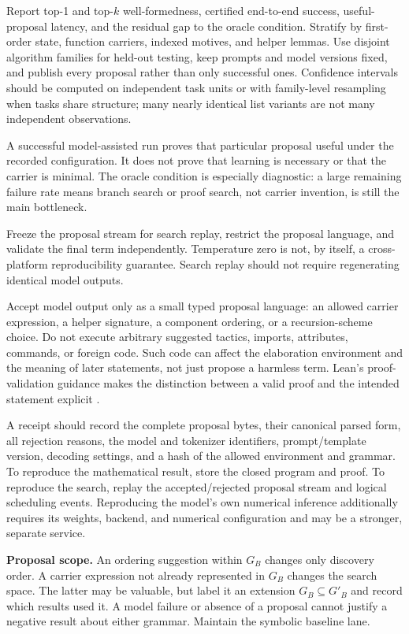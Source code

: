 Report top-1 and top-$k$ well-formedness, certified end-to-end success, useful-proposal latency, and the residual gap to the oracle condition. Stratify by first-order state, function carriers, indexed motives, and helper lemmas. Use disjoint algorithm families for held-out testing, keep prompts and model versions fixed, and publish every proposal rather than only successful ones. Confidence intervals should be computed on independent task units or with family-level resampling when tasks share structure; many nearly identical list variants are not many independent observations.

A successful model-assisted run proves that particular proposal useful under the recorded configuration. It does not prove that learning is necessary or that the carrier is minimal. The oracle condition is especially diagnostic: a large remaining failure rate means branch search or proof search, not carrier invention, is still the main bottleneck.

\ans Freeze the proposal stream for search replay, restrict the proposal language, and validate the final term independently. Temperature zero is not, by itself, a cross-platform reproducibility guarantee. Search replay should not require regenerating identical model outputs.

Accept model output only as a small typed proposal language: an allowed carrier expression, a helper signature, a component ordering, or a recursion-scheme choice. Do not execute arbitrary suggested tactics, imports, attributes, commands, or foreign code. Such code can affect the elaboration environment and the meaning of later statements, not just propose a harmless term. Lean's proof-validation guidance makes the distinction between a valid proof and the intended statement explicit \cite{leanvalidation}.

A receipt should record the complete proposal bytes, their canonical parsed form, all rejection reasons, the model and tokenizer identifiers, prompt/template version, decoding settings, and a hash of the allowed environment and grammar. To reproduce the mathematical result, store the closed program and proof. To reproduce the search, replay the accepted/rejected proposal stream and logical scheduling events. Reproducing the model's own numerical inference additionally requires its weights, backend, and numerical configuration and may be a stronger, separate service.

\textbf{Proposal scope.} An ordering suggestion within $G_B$ changes only discovery order. A carrier expression not already represented in $G_B$ changes the search space. The latter may be valuable, but label it an extension $G_B\subseteq G'_B$ and record which results used it. A model failure or absence of a proposal cannot justify a negative result about either grammar. Maintain the symbolic baseline lane.

